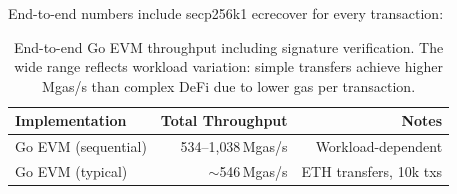 End-to-end numbers include secp256k1 ecrecover for every transaction:

\begin{table}[h]
\centering
\small
\begin{tabular}{lrr}
\toprule
\textbf{Implementation} & \textbf{Total Throughput} & \textbf{Notes} \\
\midrule
Go EVM (sequential)    & 534--1{,}038\,Mgas/s & Workload-dependent \\
Go EVM (typical)       & $\sim$546\,Mgas/s    & ETH transfers, 10k txs \\
\bottomrule
\end{tabular}
\caption{End-to-end Go EVM throughput including signature verification.
The wide range reflects workload variation: simple transfers achieve higher
Mgas/s than complex DeFi due to lower gas per transaction.}
\label{tab:e2e_go}
\end{table}

